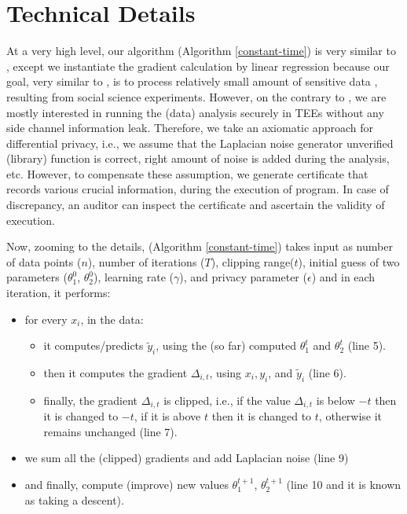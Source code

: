 \documentclass[sigplan,screen]{acmart}
\begin{document}
\section{Technical Details}
At a very high level, our algorithm  (Algorithm \ref{constant-time}) is very 
similar to \cite{ abadi2016deep}, 
except we instantiate the gradient calculation by linear regression because 
our goal, very similar to \cite{alabi2020differentially}, is to process 
relatively small amount of sensitive data \cite{NBERw25626, NBERw19843, 622437}, resulting from 
social science experiments. However, on the contrary to \cite{alabi2020differentially}, 
we are mostly interested in running the (data) analysis securely in TEEs without any 
side channel information leak. Therefore, we take an axiomatic approach for differential 
privacy, i.e., we assume that the Laplacian noise generator unverified (library) function is correct, 
right amount of noise is added during the analysis, etc. However, to compensate
these assumption, we generate certificate that records various crucial information,
during the execution of program.  In case of discrepancy, an auditor can inspect 
the certificate and ascertain the validity of execution. 


 Now, zooming to the details, (Algorithm \ref{constant-time}) takes input as  
 number of data points ($n$), number of iterations ($T$), clipping range($t$), 
 initial guess of two parameters ($\theta_{1}^{0}$, $\theta_{2}^{0}$), learning 
 rate ($\gamma$), and privacy parameter ($\epsilon$) and in each iteration, it performs: 
 \begin{itemize}
     \item for every $x_{i}$, in the data:
     \begin{itemize}
         \item it computes/predicts $\tilde{y}_{i}$, 
       using the (so far) computed $\theta_{1}^{t}$  and  $\theta_{2}^{t}$ (line 5).
     \item then it computes the gradient $\Delta_{i, t}$, using $x_{i}, y_{i}$, and $\tilde{y}_{i}$
       (line 6).
     \item finally, the gradient $\Delta_{i, t}$ is clipped, i.e., if the value $\Delta_{i, t}$ is 
     below $-t$ then it is changed to $-t$, if it is above $t$ then it is changed to $t$, otherwise 
     it remains unchanged (line 7).
     \end{itemize}
    \item we sum all the (clipped) gradients and add Laplacian noise (line 9)
    \item and finally, compute (improve) new values $\theta_{1}^{t+1}$, $\theta_{2}^{t+1}$ (line 10 and
     it is known as taking a descent).
 \end{itemize}
\end{document}
